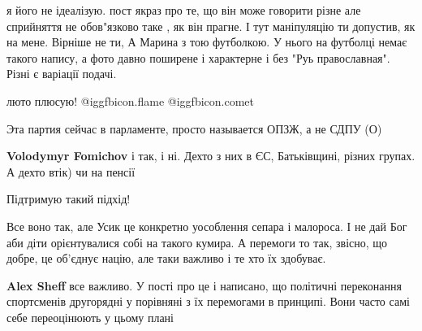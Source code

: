\begin{itemize}
\begin{itemize}
я його не ідеалізую. пост якраз про те, що він може говорити різне але
сприйняття не обов"язково таке , як він прагне. І тут маніпуляцію ти допустив,
як на мене. Вірніше не ти, А Марина з тою футболкою. У нього на футболці немає
такого напису, а фото давно поширене і характерне і без "Руь православная".
Різні є варіації подачі.

\end{itemize} %


люто плюсую!  @igg{fbicon.flame} @igg{fbicon.comet}

Эта партия сейчас в парламенте, просто называется ОПЗЖ, а не СДПУ (О)

\begin{itemize} %
\textbf{Volodymyr Fomichov} і так, і ні. Дехто з них в ЄС, Батьківщині, різних групах. А дехто втік) чи на пенсії
\end{itemize} %


Підтримую такий підхід!


Все воно так, але Усик це конкретно уособлення сепара і малороса. І не дай Бог
аби діти орієнтувалися собі на такого кумира. А перемоги то так, звісно, що
добре, це об'єднує націю, але таки важливо і те хто їх здобуває.

\begin{itemize} %
\textbf{Alex Sheff} все важливо. У пості про це і написано, що політичні переконання спортсменів другорядні у порівняні з їх перемогами в принципі. Вони часто самі себе переоцінюють у цьому плані
\end{itemize} %


\end{itemize} %

